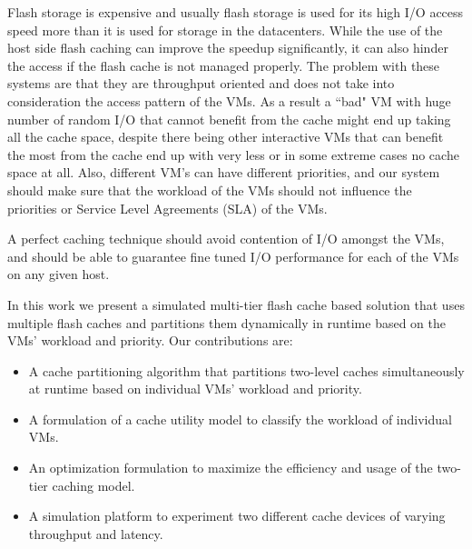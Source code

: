 Flash storage is expensive and usually flash storage is used for its high I/O access speed more than it is used for storage in the datacenters. While the use of the host side flash caching can improve the speedup significantly, it can also hinder the access if the flash cache is not managed properly. The problem with these systems are that they are throughput oriented and does not take into consideration the access pattern of the VMs. As a result a ``bad" VM with huge number of random I/O that cannot benefit from the cache might end up taking all the cache space, despite there being other interactive VMs that can benefit the most from the cache end up with very less or in some extreme cases no cache space at all. Also, different VM's can have different priorities, and our system should make sure that the workload of the VMs should not influence the priorities or Service Level Agreements (SLA) of the VMs.

A perfect caching technique should avoid contention of I/O amongst the VMs, and should be able to guarantee fine tuned I/O performance for each of the VMs on any given host.

In this work we present a simulated multi-tier flash cache based solution that uses multiple flash caches and partitions them dynamically in runtime based on the VMs' workload and priority. Our contributions are:
\begin{itemize}
\item A cache partitioning algorithm that partitions two-level caches simultaneously at runtime based on individual VMs' workload and priority.
\item A formulation of a cache utility model to classify the workload of individual VMs.
\item An optimization formulation to maximize the efficiency and usage of the two-tier caching model.
\item A simulation platform to experiment two different cache devices of varying throughput and latency.
\end{itemize}
